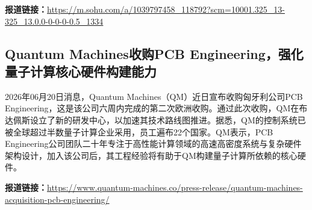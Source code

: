 \documentclass[12pt,a4paper]{ctexart}
\begin{document}
\noindent\textbf{报道链接：}\url{https://m.sohu.com/a/1039797458\_118792?scm=10001.325\_13-325\_13.0.0-0-0-0-0.5\_1334}

\subsection{ Quantum Machines收购PCB Engineering，强化量子计算核心硬件构建能力 }

2026年06月20日消息，Quantum Machines（QM）近日宣布收购匈牙利公司PCB Engineering，这是该公司六周内完成的第二次欧洲收购。通过此次收购，QM在布达佩斯设立了新的研发中心，以加速其技术路线图推进。据悉，QM的控制系统已被全球超过半数量子计算企业采用，员工遍布22个国家。QM表示，PCB Engineering公司团队二十年专注于高性能计算领域的高速高密度系统与复杂硬件架构设计，加入该公司后，其工程经验将有助于QM构建量子计算所依赖的核心硬件。

\noindent\textbf{报道链接：}\url{https://www.quantum-machines.co/press-release/quantum-machines-acquisition-pcb-engineering/}
\end{document}
